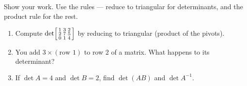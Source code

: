 \documentclass[10pt]{article}
\begin{document}
\begin{practicebox}
Show your work. Use the rules --- reduce to triangular for determinants, and the product rule for the rest.
\begin{enumerate}[leftmargin=1.6em, itemsep=6pt]
  \item Compute $\det\begin{bsmallmatrix} 1 & 3 & 2 \\ 2 & 7 & 5 \\ 0 & 1 & 4 \end{bsmallmatrix}$ by reducing to triangular (product of the pivots). \writeline
  \item You add $3\times(\text{row }1)$ to row $2$ of a matrix. What happens to its determinant? \writeline
  \item If $\det A=4$ and $\det B=2$, find $\det(AB)$ and $\det A^{-1}$. \writeline
\end{enumerate}
\end{practicebox}
\end{document}
